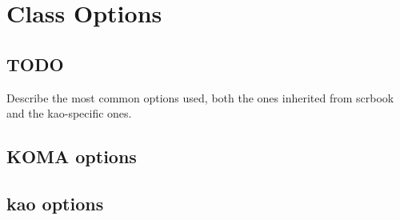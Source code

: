 \setchapterpreamble[u]{\margintoc}
\chapter{Class Options}

\section{TODO}

Describe the most common options used, both the ones inherited from 
scrbook and the kao-specific ones.

\section{KOMA options}

\section{kao options}
